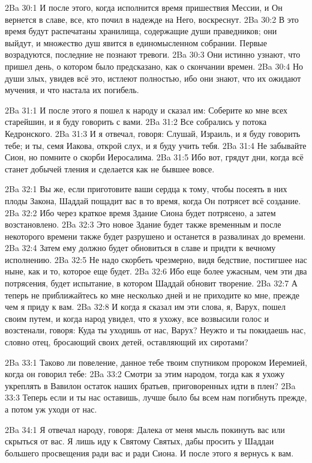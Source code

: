 \vs 2Ba 30:1
И после этого, когда исполнится время пришествия Мессии, и Он вернется в славе, все, кто почил в надежде на Него, воскреснут.
\vs 2Ba 30:2
В это время будут распечатаны хранилища, содержащие души праведников; они выйдут, и множество душ явится в единомысленном собрании. Первые возрадуются, последние не познают тревоги.
\vs 2Ba 30:3
Они истинно узнают, что пришел день, о котором было предсказано, как о скончании времен.
\vs 2Ba 30:4
Но души злых, увидев всё это, истлеют полностью, ибо они знают, что их ожидают мучения, и что настала их погибель.

\vs 2Ba 31:1
И после этого я пошел к народу и сказал им: Соберите ко мне всех старейшин, и я буду говорить с вами.
\vs 2Ba 31:2
Все собрались у потока Кедронского.
\vs 2Ba 31:3
И я отвечал, говоря: Слушай, Израиль, и я буду говорить тебе; и ты, семя Иакова, открой слух, и я буду учить тебя.
\vs 2Ba 31:4
Не забывайте Сион, но помните о скорби Иеросалима.
\vs 2Ba 31:5
Ибо вот, грядут дни, когда всё станет добычей тления и сделается как не бывшее вовсе.

\vs 2Ba 32:1
Вы же, если приготовите ваши сердца к тому, чтобы посеять в них плоды Закона, Шаддай пощадит вас в то время, когда Он потрясет всё создание.
\vs 2Ba 32:2
Ибо через краткое время Здание Сиона будет потрясено, а затем возстановлено.
\vs 2Ba 32:3
Это новое Здание будет также временным и после некоторого времени также будет разрушено и останется в развалинах до времени.
\vs 2Ba 32:4
Затем ему должно будет обновиться в славе и придти к вечному исполнению.
\vs 2Ba 32:5
Не надо скорбеть чрезмерно, видя бедствие, постигшее нас ныне, как и то, которое еще будет.
\vs 2Ba 32:6
Ибо еще более ужасным, чем эти два потрясения, будет испытание, в котором Шаддай обновит творение.
\vs 2Ba 32:7
А теперь не приближайтесь ко мне несколько дней и не приходите ко мне, прежде чем я приду к вам.
\vs 2Ba 32:8
И когда я сказал им эти слова, я, Варух, пошел своим путем, и когда народ увидел, что я ухожу, все возвысили голос и возстенали, говоря: Куда ты уходишь от нас, Варух? Неужто и ты покидаешь нас, словно отец, бросающий своих детей, оставляющий их сиротами?

\vs 2Ba 33:1
Таково ли повеление, данное тебе твоим спутником пророком Иеремией, когда он говорил тебе:
\vs 2Ba 33:2
Смотри за этим народом, тогда как я ухожу укреплять в Вавилон остаток наших братьев, приговоренных идти в плен?
\vs 2Ba 33:3
Теперь если и ты нас оставишь, лучше было бы всем нам погибнуть прежде, а потом уж уходи от нас.

\vs 2Ba 34:1
Я отвечал народу, говоря: Далека от меня мысль покинуть вас или скрыться от вас. Я лишь иду к Святому Святых, дабы просить у Шаддаи большего просвещения ради вас и ради Сиона. И после этого я вернусь к вам.

